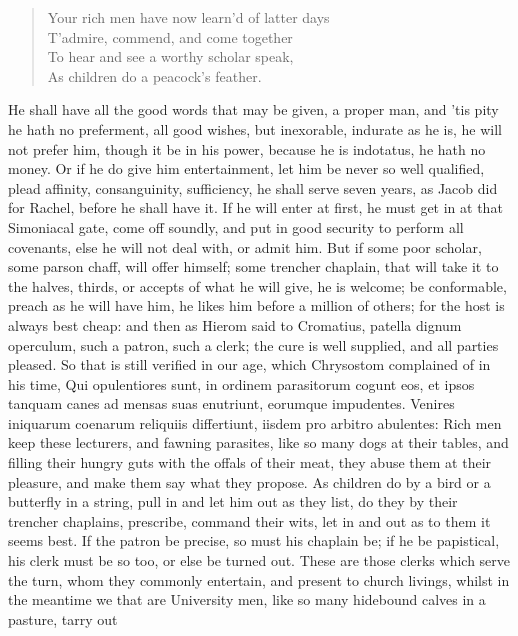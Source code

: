 {\begin{verse}
Your rich men have now learn'd of latter days\\
T'admire, commend, and come together\\

To hear and see a worthy scholar speak,\\
As children do a peacock's feather.
\end{verse}

He shall have all the good words that may be given, a proper man,
and 'tis pity he hath no preferment, all good wishes, but inexorable,
indurate as he is, he will not prefer him, though it be in his power,
because he is indotatus, he hath no money. Or if he do give him
entertainment, let him be never so well qualified, plead affinity,
consanguinity, sufficiency, he shall serve seven years, as Jacob did
for Rachel, before he shall have it. If he will enter at first,
he must get in at that Simoniacal gate, come off soundly, and put in
good security to perform all covenants, else he will not deal with, or
admit him. But if some poor scholar, some parson chaff, will offer
himself; some trencher chaplain, that will take it to the halves,
thirds, or accepts of what he will give, he is welcome; be conformable,
preach as he will have him, he likes him before a million of others;
for the host is always best cheap: and then as Hierom said to
Cromatius, patella dignum operculum, such a patron, such a clerk; the
cure is well supplied, and all parties pleased. So that is still
verified in our age, which Chrysostom complained of in his time,
Qui opulentiores sunt, in ordinem parasitorum cogunt eos, et ipsos
tanquam canes ad mensas suas enutriunt, eorumque impudentes. Venires
iniquarum coenarum reliquiis differtiunt, iisdem pro arbitro abulentes:
Rich men keep these lecturers, and fawning parasites, like so many dogs
at their tables, and filling their hungry guts with the offals of their
meat, they abuse them at their pleasure, and make them say what they
propose. As children do by a bird or a butterfly in a string,
pull in and let him out as they list, do they by their trencher
chaplains, prescribe, command their wits, let in and out as to them it
seems best. If the patron be precise, so must his chaplain be; if he be
papistical, his clerk must be so too, or else be turned out. These are
those clerks which serve the turn, whom they commonly entertain, and
present to church livings, whilst in the meantime we that are
University men, like so many hidebound calves in a pasture, tarry out
}
